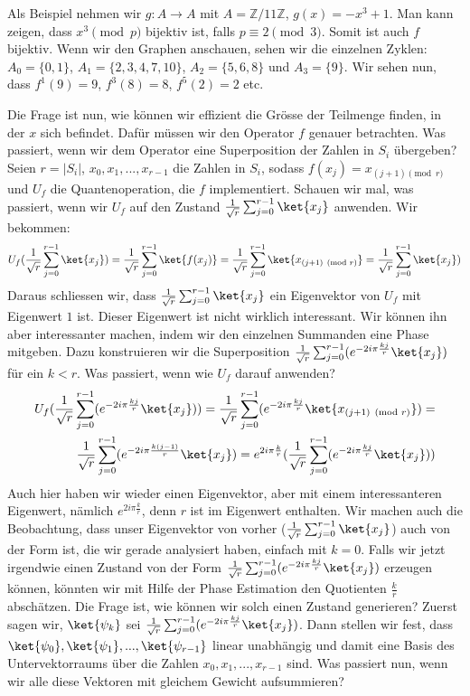 Als Beispiel nehmen wir $g : A \rightarrow A$ mit $A = \mathbb{Z}/11\mathbb{Z}$, $g(x) = -x^3 + 1$. Man kann zeigen, dass $x^3 \pmod{p}$ bijektiv ist, falls $p \equiv 2 \pmod 3$. Somit ist auch $f$ bijektiv. Wenn wir den Graphen anschauen, sehen wir die einzelnen Zyklen: $A_0 = \{0, 1\}$, $A_1 = \{2, 3, 4, 7, 10\}$, $A_2 = \{5, 6, 8\}$ und $A_3 = \{9\}$. Wir sehen nun, dass $f^1(9) = 9$, $f^3(8) = 8$, $f^5(2) = 2$ etc. 



Die Frage ist nun, wie können wir effizient die Grösse der Teilmenge finden, in der $x$ sich befindet. Dafür müssen wir den Operator $f$ genauer betrachten. Was passiert, wenn wir dem Operator eine Superposition der Zahlen in $S_i$ übergeben? Seien $r = |S_i|$, $x_0, x_1, ..., x_{r - 1}$ die Zahlen in $S_i$, sodass $f(x_j) = x_{(j + 1) \pmod{r}}$ und $U_f$ die Quantenoperation, die $f$ implementiert. Schauen wir mal, was passiert, wenn wir $U_f$ auf den Zustand $\frac{1}{\sqrt{r}}\sum_{j = 0}^{r - 1}\ket{x_j}$ anwenden. Wir bekommen:
\begin{align*}
    U_f(\frac{1}{\sqrt{r}}\sum_{j = 0}^{r - 1}\ket{x_j}) = \frac{1}{\sqrt{r}}\sum_{j = 0}^{r - 1}\ket{f(x_j)} = \frac{1}{\sqrt{r}}\sum_{j = 0}^{r - 1}\ket{x_{(j + 1) \pmod{r}}} = \frac{1}{\sqrt{r}}\sum_{j = 0}^{r - 1}\ket{x_j})
\end{align*}
Daraus schliessen wir, dass $\frac{1}{\sqrt{r}}\sum_{j = 0}^{r - 1}\ket{x_j}$ ein Eigenvektor von $U_f$ mit Eigenwert $1$ ist. Dieser Eigenwert ist nicht wirklich interessant. Wir können ihn aber interessanter machen, indem wir den einzelnen Summanden eine Phase mitgeben. Dazu konstruieren wir die Superposition $\frac{1}{\sqrt{r}}\sum_{j = 0}^{r - 1}(e^{-2i\pi\frac{kj}{r}}\ket{x_j})$ für ein $k < r$. Was passiert, wenn wie $U_f$ darauf anwenden? 
\begin{align*}
    U_f(\frac{1}{\sqrt{r}}\sum_{j = 0}^{r - 1}(e^{-2i\pi\frac{kj}{r}}\ket{x_j})) = \frac{1}{\sqrt{r}}\sum_{j = 0}^{r - 1}(e^{-2i\pi\frac{kj}{r}}\ket{x_{(j + 1) \pmod{r}}}) = \\
    \frac{1}{\sqrt{r}}\sum_{j = 0}^{r - 1}(e^{-2i\pi\frac{k(j - 1)}{r}}\ket{x_j}) = e^{2i\pi\frac{k}{r}}(\frac{1}{\sqrt{r}}\sum_{j = 0}^{r - 1}(e^{-2i\pi\frac{kj}{r}}\ket{x_j}))
\end{align*}
Auch hier haben wir wieder einen Eigenvektor, aber mit einem interessanteren Eigenwert, nämlich $e^{2i\pi\frac{k}{r}}$, denn $r$ ist im Eigenwert enthalten. Wir machen auch die Beobachtung, dass unser Eigenvektor von vorher ($\frac{1}{\sqrt{r}}\sum_{j = 0}^{r - 1}\ket{x_j}$) auch von der Form ist, die wir gerade analysiert haben, einfach mit $k = 0$. Falls wir jetzt irgendwie einen Zustand von der Form $\frac{1}{\sqrt{r}}\sum_{j = 0}^{r - 1}(e^{-2i\pi\frac{kj}{r}}\ket{x_j})$ erzeugen können, könnten wir mit Hilfe der Phase Estimation den Quotienten $\frac{k}{r}$ abschätzen. Die Frage ist, wie können wir solch einen Zustand generieren? Zuerst sagen wir, $\ket{\psi_k}$ sei $\frac{1}{\sqrt{r}}\sum_{j = 0}^{r - 1}(e^{-2i\pi\frac{kj}{r}}\ket{x_j})$. Dann stellen wir fest, dass $\ket{\psi_0}, \ket{\psi_1}, ..., \ket{\psi_{r - 1}}$ linear unabhängig und damit eine Basis des Untervektorraums über die Zahlen $x_0, x_1, ..., x_{r - 1}$ sind. Was passiert nun, wenn wir alle diese Vektoren mit gleichem Gewicht aufsummieren?
